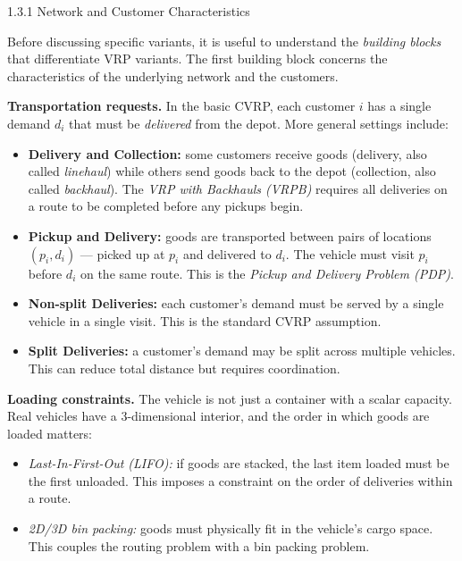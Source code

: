 \documentclass[aspectratio=169,10pt]{beamer}
\begin{document}
\begin{frame}[allowframebreaks]{1.3.1 Network and Customer Characteristics}

Before discussing specific variants, it is useful to understand the \emph{building
blocks} that differentiate VRP variants.  The first building block concerns the
characteristics of the underlying network and the customers.

\medskip
\textbf{Transportation requests.}
In the basic CVRP, each customer $i$ has a single demand $d_i$ that must be
\emph{delivered} from the depot.  More general settings include:

\begin{itemize}
  \item \textbf{Delivery and Collection:} some customers receive goods (delivery, also
        called \emph{linehaul}) while others send goods back to the depot (collection,
        also called \emph{backhaul}).  The \emph{VRP with Backhauls (VRPB)} requires
        all deliveries on a route to be completed before any pickups begin.

  \item \textbf{Pickup and Delivery:} goods are transported between pairs of locations
        $(p_i, d_i)$ --- picked up at $p_i$ and delivered to $d_i$.  The vehicle must
        visit $p_i$ before $d_i$ on the same route.  This is the
        \emph{Pickup and Delivery Problem (PDP)}.

  \item \textbf{Non-split Deliveries:} each customer's demand must be served by a single
        vehicle in a single visit.  This is the standard CVRP assumption.

  \item \textbf{Split Deliveries:} a customer's demand may be split across multiple
        vehicles.  This can reduce total distance but requires coordination.
\end{itemize}

\framebreak

\textbf{Loading constraints.}
The vehicle is not just a container with a scalar capacity.  Real vehicles have a
3-dimensional interior, and the order in which goods are loaded matters:
\begin{itemize}
  \item \emph{Last-In-First-Out (LIFO):} if goods are stacked, the last item loaded
        must be the first unloaded.  This imposes a constraint on the order of
        deliveries within a route.
  \item \emph{2D/3D bin packing:} goods must physically fit in the vehicle's cargo space.
        This couples the routing problem with a bin packing problem.
\end{itemize}


\end{frame}
\end{document}
